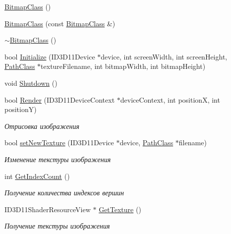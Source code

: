 \begin{DoxyCompactItemize}
\item 
\hyperlink{class_bitmap_class_a0f4b9cd7df6c426024269b5c6a44dca9}{Bitmap\+Class} ()
\item 
\hyperlink{class_bitmap_class_a0933d9b08bfd5035e80c9c727456dcbb}{Bitmap\+Class} (const \hyperlink{class_bitmap_class}{Bitmap\+Class} \&)
\item 
\hyperlink{class_bitmap_class_a3513d51b4fc4219b4ddb09fd23cda528}{$\sim$\+Bitmap\+Class} ()
\item 
bool \hyperlink{class_bitmap_class_a6bd2ec2f55bd8dd88b94829779b1ca8e}{Initialize} (I\+D3\+D11\+Device $\ast$device, int screen\+Width, int screen\+Height, \hyperlink{class_path_class}{Path\+Class} $\ast$texture\+Filename, int bitmap\+Width, int bitmap\+Height)
\item 
void \hyperlink{class_bitmap_class_a5d8c2363514af59acd8c2f3ee042294b}{Shutdown} ()
\item 
bool \hyperlink{class_bitmap_class_acabcd75cf86b16596cfc874fae6a830a}{Render} (I\+D3\+D11\+Device\+Context $\ast$device\+Context, int positionX, int positionY)
\begin{DoxyCompactList}\small\item\em Отрисовка изображения \end{DoxyCompactList}\item 
bool \hyperlink{class_bitmap_class_a08e06db84ba1088a4eaa145ef8b1cd6c}{set\+New\+Texture} (I\+D3\+D11\+Device $\ast$device, \hyperlink{class_path_class}{Path\+Class} $\ast$filename)
\begin{DoxyCompactList}\small\item\em Изменение текстуры изображения \end{DoxyCompactList}\item 
int \hyperlink{class_bitmap_class_aaafad2742ba7dcf9bcb3556579e7d9e5}{Get\+Index\+Count} ()
\begin{DoxyCompactList}\small\item\em Получение количества индексов вершин \end{DoxyCompactList}\item 
I\+D3\+D11\+Shader\+Resource\+View $\ast$ \hyperlink{class_bitmap_class_a9fc1968daa483cea1fede7d6785a7254}{Get\+Texture} ()
\begin{DoxyCompactList}\small\item\em Получение текстуры изображения \end{DoxyCompactList}\end{DoxyCompactItemize}
